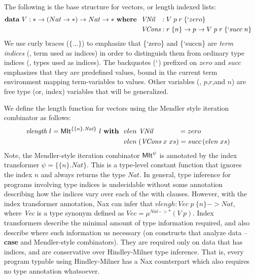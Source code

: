 The following is the base structure for vectors, or length indexed lists:
\begin{align*}
\textbf{data}~V : * -> (Nat -> *) -> Nat -> * ~\textbf{where}~~
& \textit{VNil}~~\, : V\;p\;r\;\{`zero\} \\
& \textit{VCons}    : r\;\{n\} -> p -> V\;p\;r\;\{`succ\;n\}
\end{align*}
We use curly braces ($\{\dots\}$) to emphasize that
\{`zero\} and 
\{`succ\;n\}
are \emph{term indices}
(\ie, term used as indices) in order to distinguish them from ordinary
type indices (\ie, types used as indices). The backquotes ($`$) prefixed
on $zero$ and $succ$ emphasizes that they are predefined values, bound
in the current term environment mapping term-variables to values. Other
variables (\eg, $p$,$r$,and $n$) are
free type (or, index) variables that will be generalized.

We define the length function for vectors using the Mendler style
iteration combinator as follows:
\begin{align*}
\textit{vlength}~l = \textsf{MIt}^{\{\{n\} . \textit{Nat}\}}~l~\textbf{with}~~
&  vlen ~\textit{VNil}~~~~~~~~~~~ = zero \\
&  vlen \;(\textit{VCons}\;x\;xs) = succ\,(vlen\;xs)
\end{align*}
Note, the Mendler-style iteration combinator $\textsf{MIt}^\psi$ is annotated by
the index transformer $\psi = \{\{n\} . \textit{Nat}\}$. This is
a type-level constant function that ignores the index $n$ and always returns
the type $\textit{Nat}$. In general, type inference for programs involving
type indices is undecidable without some annotation describing how the indices
vary over each of the \textsf{with} clauses. However, with the
index transformer annotation, Nax can infer that
$vlengh : \textit{Vec}\;p\;\{n\} -> \textit{Nat}$,
where \textit{Vec} is a type synonym defined as
$\textit{Vec} = \mu^{\textit{Nat} -> *}(V\;p)$.
Index transformers describe the minimal amount of type information required,
and also describe where such information us necessary (on constructs that
analyze data -- \textbf{case} and Mendler-style combinators).
They are required only on data that has indices, and are conservative over
Hindley-Milner type inference. That is, every program typable using
Hindley-Milner has a Nax counterpart which also requires no type annotation
whatsoever.


